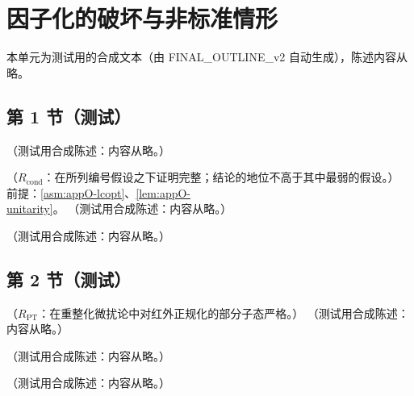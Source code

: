 \chapter{因子化的破坏与非标准情形}\label{ch:break}
本单元为测试用的合成文本（由 FINAL\_OUTLINE\_v2 自动生成），陈述内容从略。

\section{第 1 节（测试）}\label{sec:break-overview}

\begin{definition}\label{def:break-generalized-tmd}
（测试用合成陈述：内容从略。）
\end{definition}

\begin{proposition}\label{prop:break-measurement}
（$R_{\mathrm{cond}}$：在所列编号假设之下证明完整；结论的地位不高于其中最弱的假设。）
前提：\cref{asm:appO-lcopt}、\cref{lem:appO-unitarity}。
（测试用合成陈述：内容从略。）
\end{proposition}

\begin{remark}[失效的位置]\label{rem:break-measurement-failures}
（测试用合成陈述：内容从略。）
\end{remark}

\section{第 2 节（测试）}\label{sec:break-tmd}

\begin{proposition}\label{prop:break-colour}
（$R_{\mathrm{PT}}$：在重整化微扰论中对红外正规化的部分子态严格。）
（测试用合成陈述：内容从略。）
\end{proposition}

\begin{example}\label{ex:break-colour}
（测试用合成陈述：内容从略。）
\end{example}

\begin{theorem}\label{thm:break-tmd}
（测试用合成陈述：内容从略。）
\end{theorem}
